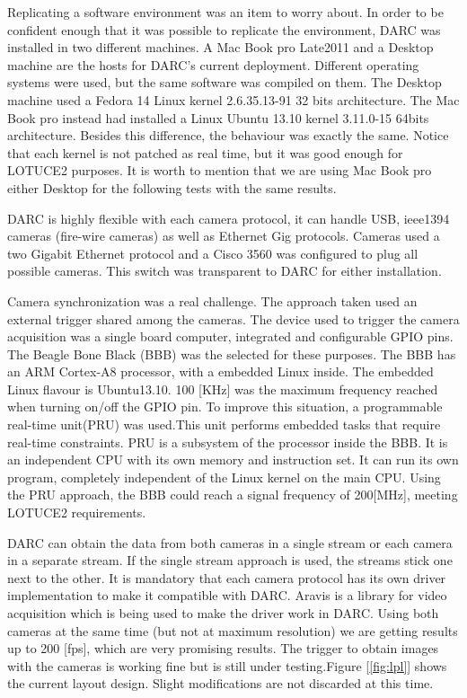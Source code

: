 \documentclass[]{spie}  %
\begin{document}
Replicating a software environment was an item to worry about. In order to be
confident enough that it was possible to replicate the environment, DARC was
installed in two different machines. A Mac Book pro Late2011 and a
Desktop machine are the hosts for DARC's current deployment. Different operating
systems were used, but the same software was compiled on them. The
Desktop machine used a Fedora 14 Linux kernel 2.6.35.13-91 32 bits architecture.
The Mac Book pro instead had installed a Linux Ubuntu 13.10 kernel 3.11.0-15
64bits architecture.  Besides this difference, the behaviour was exactly the
same. Notice that each kernel is not patched as real time, but it was good
enough for LOTUCE2 purposes. It is worth to mention that we are using  Mac Book
pro either Desktop for the following tests with the same results.

DARC is highly flexible with each camera protocol, it can handle USB, ieee1394
cameras (fire-wire cameras) as well as Ethernet Gig protocols. Cameras used a
two Gigabit Ethernet protocol and a Cisco 3560 was configured to plug all possible
cameras. This switch was transparent to DARC for either installation.  

Camera synchronization was a real challenge. The approach taken used an
external trigger shared among the cameras. The device used to trigger the
camera acquisition was a single board computer, integrated and
configurable GPIO pins.  The Beagle Bone Black (BBB) was the selected for these
purposes. The BBB has an ARM Cortex-A8 processor, with a embedded Linux inside.
The embedded Linux flavour is Ubuntu13.10. 100 [KHz] was the  maximum frequency
reached when turning on/off the GPIO pin. To improve this situation, a
programmable real-time unit(PRU) was used.This unit performs embedded tasks
that require real-time constraints. PRU is a subsystem of the processor inside
the BBB. It is an independent CPU with its own memory and instruction set. It
can run its own program, completely independent of the Linux kernel on the main
CPU. Using the PRU approach, the BBB could reach a signal frequency of
200[MHz], meeting LOTUCE2 requirements.

DARC can obtain the data from both cameras in a single stream or each camera in
a separate stream. If the single stream approach is used, the streams stick one
next to the other. It is mandatory that each camera protocol has its own driver
implementation to make it compatible with DARC. Aravis is a library for video
acquisition which is being used to make the driver work in DARC. Using both
cameras at the same time (but not at maximum resolution) we are getting results
up to 200 [fps], which are very promising results. The trigger to obtain images
with the cameras is working fine but is still under testing.Figure
[\ref{fig:lpl}] shows the current layout design. Slight modifications are not
discarded at this time.
\end{document}
